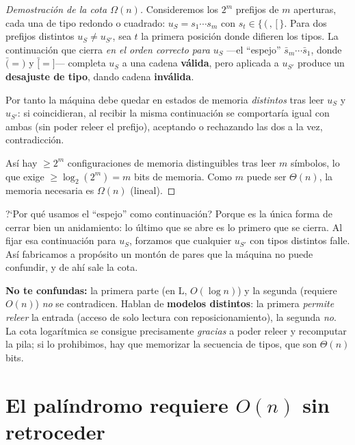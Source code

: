\documentclass[11pt,a4paper]{article}
\theoremstyle{plain}
\theoremstyle{definition}
\newcommand{\Lclass}{\mathrm{L}}
\begin{document}
\begin{proof}[Demostraci\'on de la cota $\Omega(n)$]
Consideremos los $2^{m}$ prefijos de $m$ aperturas, cada una de tipo redondo o
cuadrado: $u_S=s_1\cdots s_m$ con $s_t\in\{\,\texttt{(}\,,\,\texttt{[}\,\}$. Para dos
prefijos distintos $u_S\neq u_{S'}$, sea $t$ la primera posici\'on donde difieren los
tipos. La continuaci\'on que cierra \emph{en el orden correcto para $u_S$} ---el
``espejo'' $\bar s_m\cdots\bar s_1$, donde $\bar{\texttt{(}}=\texttt{)}$ y
$\bar{\texttt{[}}=\texttt{]}$--- completa $u_S$ a una cadena \textbf{v\'alida}, pero
aplicada a $u_{S'}$ produce un \textbf{desajuste de tipo}, dando cadena
\textbf{inv\'alida}.

Por tanto la m\'aquina debe quedar en estados de memoria \emph{distintos} tras leer
$u_S$ y $u_{S'}$: si coincidieran, al recibir la misma continuaci\'on se comportar\'ia
igual con ambas (sin poder releer el prefijo), aceptando o rechazando las dos a la
vez, contradicci\'on.

As\'i hay $\ge 2^{m}$ configuraciones de memoria distinguibles tras leer $m$
s\'imbolos, lo que exige $\ge\log_2(2^m)=m$ bits de memoria. Como $m$ puede ser
$\Theta(n)$, la memoria necesaria es $\Omega(n)$ (lineal).
\end{proof}

\begin{porque}
?`Por qu\'e usamos el ``espejo'' como continuaci\'on? Porque es la \'unica forma de
cerrar bien un anidamiento: lo \'ultimo que se abre es lo primero que se cierra. Al
fijar esa continuaci\'on para $u_S$, forzamos que cualquier $u_{S'}$ con tipos
distintos falle. As\'i fabricamos a prop\'osito un mont\'on de pares que la m\'aquina no
puede confundir, y de ah\'i sale la cota.
\end{porque}

\begin{cuidado}
\textbf{No te confundas:} la primera parte (en $\Lclass$, $O(\log n)$) y la segunda
(requiere $O(n)$) \emph{no} se contradicen. Hablan de \textbf{modelos distintos}: la
primera \emph{permite releer} la entrada (acceso de solo lectura con
reposicionamiento), la segunda \emph{no}. La cota logar\'itmica se consigue
precisamente \emph{gracias} a poder releer y recomputar la pila; si lo prohibimos, hay
que memorizar la secuencia de tipos, que son $\Theta(n)$ bits.
\end{cuidado}

\section{El pal\'indromo requiere $O(n)$ sin retroceder}
\end{document}
